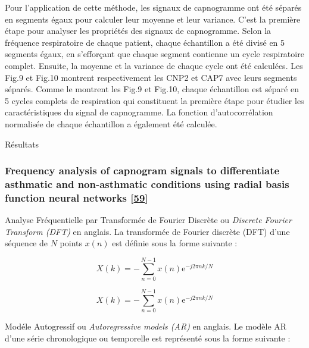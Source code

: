 \documentclass[12pt,]{article}
\begin{document}
Pour l'application de cette méthode, les signaux de capnogramme ont été
séparés en segments égaux pour calculer leur moyenne et leur variance.
C'est la première étape pour analyser les propriétés des signaux de
capnogramme. Selon la fréquence respiratoire de chaque patient, chaque
échantillon a été divisé en 5 segments égaux, en s'efforçant que chaque
segment contienne un cycle respiratoire complet. Ensuite, la moyenne et
la variance de chaque cycle ont été calculées. Les Fig.9 et Fig.10
montrent respectivement les CNP2 et CAP7 avec leurs segments séparés.
Comme le montrent les Fig.9 et Fig.10, chaque échantillon est séparé en
5 cycles complets de respiration qui constituent la première étape pour
étudier les caractéristiques du signal de capnogramme. La fonction
d'autocorrélation normalisée de chaque échantillon a également été
calculée.

Résultats

\hypertarget{frequency-analysis-of-capnogram-signals-to-differentiate-asthmatic-and-non-asthmatic-conditions-using-radial-basis-function-neural-networks-kazemi2013frequency}{%
\subsubsection{\texorpdfstring{Frequency analysis of capnogram signals
to differentiate asthmatic and non-asthmatic conditions using radial
basis function neural networks
{[}\protect\hyperlink{ref-kazemi2013frequency}{59}{]}}{Frequency analysis of capnogram signals to differentiate asthmatic and non-asthmatic conditions using radial basis function neural networks {[}59{]}}}\label{frequency-analysis-of-capnogram-signals-to-differentiate-asthmatic-and-non-asthmatic-conditions-using-radial-basis-function-neural-networks-kazemi2013frequency}}

Analyse Fréquentielle par Transformée de Fourier Discrète ou
\emph{Discrete Fourier Transform (DFT)} en anglais. La transformée de
Fourier discrète (DFT) d'une séquence de \(N\) points \(x(n)\) est
définie sous la forme suivante :

\[X(k)=-\sum_{n=0}^{N-1} x(n)\mathrm{e}^{-j2\pi nk/N}\]

\begin{equation}
    X(k)=-\sum_{n=0}^{N-1} x(n)\mathrm{e}^{-j2\pi nk/N}
\label{DFT}
\end{equation}

Modéle Autogressif ou \emph{Autoregressive models (AR)} en anglais. Le
modèle AR d'une série chronologique ou temporelle est représenté sous la
forme suivante :
\end{document}
